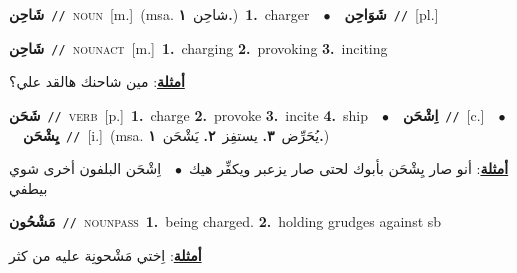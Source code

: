 \documentclass[10pt,a4paper,twoside]{article} %
\begin{document}
\begin{multicols}{2}
{\setlength\topsep{0pt}\textbf{\foreignlanguage{arabic}{شَاحِن}}\ {\color{gray}\texttt{//}\color{black}}\ \textsc{noun}\ [m.]\ \color{gray}(msa. \foreignlanguage{arabic}{شاحِن}~\foreignlanguage{arabic}{\textbf{١.}})\color{black}\ \textbf{1.}~charger\ \ $\bullet$\ \ \setlength\topsep{0pt}\textbf{\foreignlanguage{arabic}{شَوَاحِن}}\ {\color{gray}\texttt{//}\color{black}}\ [pl.]\ } \vspace{2mm}

{\setlength\topsep{0pt}\textbf{\foreignlanguage{arabic}{شَاحِن}}\ {\color{gray}\texttt{//}\color{black}}\ \textsc{noun\textunderscore act}\ [m.]\ \textbf{1.}~charging  \textbf{2.}~provoking  \textbf{3.}~inciting\  \begin{flushright}\color{gray}\foreignlanguage{arabic}{\textbf{\underline{\foreignlanguage{arabic}{أمثلة}}}: مين شاحنك هالقد علي؟}\end{flushright}\color{black}} \vspace{2mm}

{\setlength\topsep{0pt}\textbf{\foreignlanguage{arabic}{شَحَن}}\ {\color{gray}\texttt{//}\color{black}}\ \textsc{verb}\ [p.]\ \textbf{1.}~charge  \textbf{2.}~provoke  \textbf{3.}~incite  \textbf{4.}~ship\ \ $\bullet$\ \ \setlength\topsep{0pt}\textbf{\foreignlanguage{arabic}{اِشْحَن}}\ {\color{gray}\texttt{//}\color{black}}\ [c.]\ \ $\bullet$\ \ \setlength\topsep{0pt}\textbf{\foreignlanguage{arabic}{يِشْحَن}}\ {\color{gray}\texttt{//}\color{black}}\ [i.]\ \color{gray}(msa. \foreignlanguage{arabic}{يُحَرِّض}~\foreignlanguage{arabic}{\textbf{٣.}}  \foreignlanguage{arabic}{يستفِز}~\foreignlanguage{arabic}{\textbf{٢.}}  \foreignlanguage{arabic}{يَشْحَن}~\foreignlanguage{arabic}{\textbf{١.}})\color{black}\  \begin{flushright}\color{gray}\foreignlanguage{arabic}{\textbf{\underline{\foreignlanguage{arabic}{أمثلة}}}: أنو صار يِشْحَن بأبوك لحتى صار يزعبر ويكفِّر هيك\ $\bullet$\ \  اِشْحَن البلفون أخرى شوي بيطفي}\end{flushright}\color{black}} \vspace{2mm}

{\setlength\topsep{0pt}\textbf{\foreignlanguage{arabic}{مَشْحُون}}\ {\color{gray}\texttt{//}\color{black}}\ \textsc{noun\textunderscore pass}\ \textbf{1.}~being charged.  \textbf{2.}~holding grudges against sb\  \begin{flushright}\color{gray}\foreignlanguage{arabic}{\textbf{\underline{\foreignlanguage{arabic}{أمثلة}}}: اِختي مَشْحونِة عليه من كثر}\end{flushright}\color{black}} \vspace{2mm}


\end{multicols}
\end{document}
